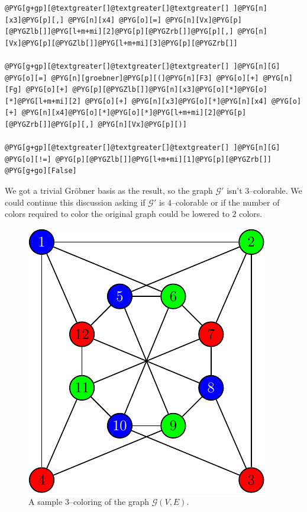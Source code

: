 \begin{Verbatim}[commandchars=@\[\]]
@PYG[g+gp][@textgreater[]@textgreater[]@textgreater[] ]@PYG[n][x3]@PYG[p][,] @PYG[n][x4] @PYG[o][=] @PYG[n][Vx]@PYG[p][@PYGZlb[]]@PYG[l+m+mi][2]@PYG[p][@PYGZrb[]]@PYG[p][,] @PYG[n][Vx]@PYG[p][@PYGZlb[]]@PYG[l+m+mi][3]@PYG[p][@PYGZrb[]]

@PYG[g+gp][@textgreater[]@textgreater[]@textgreater[] ]@PYG[n][G] @PYG[o][=] @PYG[n][groebner]@PYG[p][(]@PYG[n][F3] @PYG[o][+] @PYG[n][Fg] @PYG[o][+] @PYG[p][@PYGZlb[]]@PYG[n][x3]@PYG[o][*]@PYG[o][*]@PYG[l+m+mi][2] @PYG[o][+] @PYG[n][x3]@PYG[o][*]@PYG[n][x4] @PYG[o][+] @PYG[n][x4]@PYG[o][*]@PYG[o][*]@PYG[l+m+mi][2]@PYG[p][@PYGZrb[]]@PYG[p][,] @PYG[n][Vx]@PYG[p][)]

@PYG[g+gp][@textgreater[]@textgreater[]@textgreater[] ]@PYG[n][G] @PYG[o][!=] @PYG[p][@PYGZlb[]]@PYG[l+m+mi][1]@PYG[p][@PYGZrb[]]
@PYG[g+go][False]
\end{Verbatim}
\noindent
We got a trivial Gröbner basis as the result, so the graph $\mathcal{G'}$ isn't $3$--colorable. We
could continue this discussion asking if $\mathcal{G'}$ is $4$--colorable or if the number of colors
required to color the original graph could be lowered to $2$ colors.
\begin{figure}[htbp]
\centering

\includegraphics{graph-color.pdf}
\caption{A sample $3$--coloring of the graph $\mathcal{G}(V, E)$.\label{fig-graph-color}}\end{figure}

